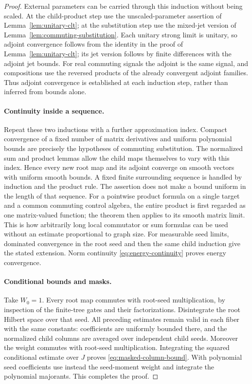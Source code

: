 \begin{proof}
External parameters can be carried through this induction
without being scaled.  At the child-product step use the
unscaled-parameter assertion of Lemma~\ref{lem:unitary-clt};
at the substitution step use the mixed-jet version of
Lemma~\ref{lem:commuting-substitution}.  Each unitary strong
limit is unitary, so adjoint convergence follows from the
identity in the proof of Lemma~\ref{lem:unitary-clt}; its
jet version follows by finite differences with the adjoint
jet bounds.  For real commuting signals the adjoint is the
same signal, and compositions use the reversed products of
the already convergent adjoint families.  Thus adjoint
convergence is established at each induction step, rather
than inferred from bounds alone.

\paragraph{Continuity inside a sequence.}
Repeat these two inductions with a further approximation
index.  Compact convergence of a fixed number of matrix
derivatives and uniform polynomial bounds are precisely
the hypotheses of commuting substitution.  The normalized
sum and product lemmas allow the child maps themselves to
vary with this index.  Hence every new root map and its
adjoint converge on smooth vectors with uniform smooth
bounds.  A fixed finite surrounding sequence is handled
by induction and the product rule.  The assertion does
not make a bound uniform in the length of that sequence.
For a pointwise product formula on a single target and a
common commuting control algebra, the entire product is
first regarded as one matrix-valued function; the theorem
then applies to its smooth matrix limit.  This is how
arbitrarily long local commutator or sum formulas can be
used without an estimate proportional to graph size.
For measurable seed limits, dominated convergence in the
root seed and then the same child induction give the
stated extension.  Norm continuity
\eqref{eq:energy-continuity} proves energy convergence.

\paragraph{Conditional bounds and masks.}
Take $W_0=1$.  Every root map commutes with root-seed
multiplication, by inspection of the finite-tree gates
and their factorizations.  Disintegrate the root Hilbert
space over that seed.  All preceding estimates remain
valid in each fiber with the same constants: coefficients
are uniformly bounded there, and the normalized child
columns are averaged over independent child seeds.
Moreover the weight commutes with root-seed multiplication.
Integrating the squared conditional estimate over $J$
proves \eqref{eq:masked-column-bound}.  With polynomial
seed coefficients use instead the seed-moment weight and
integrate the polynomial majorants.  This completes the
proof.
\end{proof}


